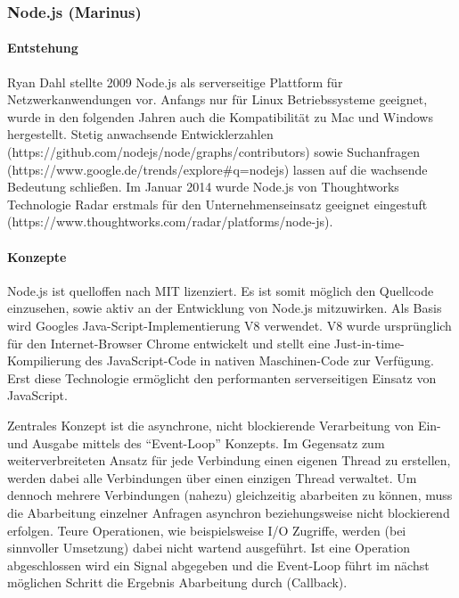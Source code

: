 \documentclass[]{article}
\begin{document}
\subsubsection{Node.js (Marinus)}\label{node.js-marinus}

\paragraph{Entstehung}\label{entstehung}

Ryan Dahl stellte 2009 Node.js als serverseitige Plattform für
Netzwerkanwendungen vor. Anfangs nur für Linux Betriebssysteme geeignet,
wurde in den folgenden Jahren auch die Kompatibilität zu Mac und Windows
hergestellt. Stetig anwachsende Entwicklerzahlen
(https://github.com/nodejs/node/graphs/contributors) sowie Suchanfragen
(https://www.google.de/trends/explore\#q=nodejs) lassen auf die
wachsende Bedeutung schließen. Im Januar 2014 wurde Node.js von
Thoughtworks Technologie Radar erstmals für den Unternehmenseinsatz
geeignet eingestuft
(https://www.thoughtworks.com/radar/platforms/node-js).

\paragraph{Konzepte}\label{konzepte-1}

Node.js ist quelloffen nach MIT lizenziert. Es ist somit möglich den
Quellcode einzusehen, sowie aktiv an der Entwicklung von Node.js
mitzuwirken. Als Basis wird Googles Java-Script-Implementierung V8
verwendet. V8 wurde ursprünglich für den Internet-Browser Chrome
entwickelt und stellt eine Just-in-time-Kompilierung des JavaScript-Code
in nativen Maschinen-Code zur Verfügung. Erst diese Technologie
ermöglicht den performanten serverseitigen Einsatz von JavaScript.

Zentrales Konzept ist die asynchrone, nicht blockierende Verarbeitung
von Ein- und Ausgabe mittels des ``Event-Loop'' Konzepts. Im Gegensatz
zum weiterverbreiteten Ansatz für jede Verbindung einen eigenen Thread
zu erstellen, werden dabei alle Verbindungen über einen einzigen Thread
verwaltet. Um dennoch mehrere Verbindungen (nahezu) gleichzeitig
abarbeiten zu können, muss die Abarbeitung einzelner Anfragen asynchron
beziehungsweise nicht blockierend erfolgen. Teure Operationen, wie
beispielsweise I/O Zugriffe, werden (bei sinnvoller Umsetzung) dabei
nicht wartend ausgeführt. Ist eine Operation abgeschlossen wird ein
Signal abgegeben und die Event-Loop führt im nächst möglichen Schritt
die Ergebnis Abarbeitung durch (Callback).
\end{document}
